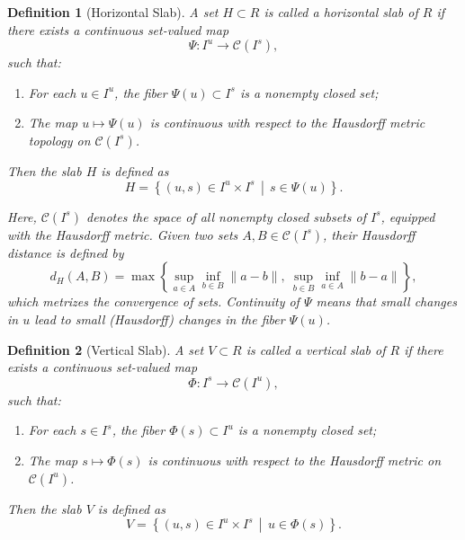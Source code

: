 \documentclass[12pt]{iopart}
\newtheorem{definition}{Definition}[section]
\begin{document}
\begin{definition}[Horizontal Slab]
A set \( H \subset R \) is called a \emph{horizontal slab of \( R \)} if there exists a continuous set-valued map
\[
\Psi : I^u \to \mathcal{C}(I^s),
\]
such that:
\begin{enumerate}
    \item For each \( u \in I^u \), the fiber \( \Psi(u) \subset I^s \) is a nonempty closed set;
    \item The map \( u \mapsto \Psi(u) \) is continuous with respect to the Hausdorff metric topology on \( \mathcal{C}(I^s) \).
\end{enumerate}
Then the slab \( H \) is defined as
\[
H = \left\{ (u, s) \in I^u \times I^s \,\middle|\, s \in \Psi(u) \right\}.
\]

Here, \( \mathcal{C}(I^s) \) denotes the space of all nonempty closed subsets of \( I^s \), equipped with the \emph{Hausdorff metric}. Given two sets \( A, B \in \mathcal{C}(I^s) \), their Hausdorff distance is defined by
\[
d_H(A, B) = \max\left\{ \sup_{a \in A} \inf_{b \in B} \|a - b\|,\ \sup_{b \in B} \inf_{a \in A} \|b - a\| \right\},
\]
which metrizes the convergence of sets. Continuity of \( \Psi \) means that small changes in \( u \) lead to small (Hausdorff) changes in the fiber \( \Psi(u) \).
\end{definition}

\begin{definition}[Vertical Slab]
A set \( V \subset R \) is called a \emph{vertical slab of \( R \)} if there exists a continuous set-valued map
\[
\Phi : I^s \to \mathcal{C}(I^u),
\]
such that:
\begin{enumerate}
    \item For each \( s \in I^s \), the fiber \( \Phi(s) \subset I^u \) is a nonempty closed set;
    \item The map \( s \mapsto \Phi(s) \) is continuous with respect to the Hausdorff metric on \( \mathcal{C}(I^u) \).
\end{enumerate}
Then the slab \( V \) is defined as
\[
V = \left\{ (u, s) \in I^u \times I^s \,\middle|\, u \in \Phi(s) \right\}.
\]
\end{definition}
\end{document}
